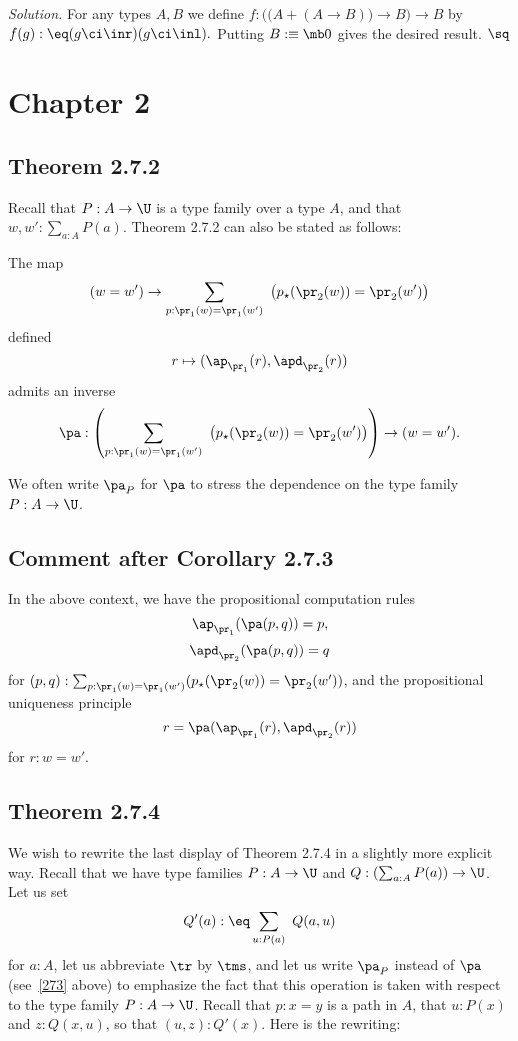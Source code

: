 \documentclass[12pt]{article}
\begin{document}
\nn\emph{Solution.} For any types $A,B$ we define $f:\Big(\big(A+(A\to B)\big)\to B\Big)\to B$ by $f(g):\eq(g\ci\inr)(g\ci\inl).$ Putting $B:\equiv\mb0$ gives the desired result. $\sq$


\section{Chapter 2}

\subsection{Theorem 2.7.2}\label{272}

Recall that $P:A\to\U$ is a type family over a type $A$, and that $w,w':\sum_{a:A}P(a)$. Theorem 2.7.2 can also be stated as follows: 

The map 
$$
(w=w')\to\sum_{p:\pr_1(w)=\pr_1(w')}\ \big(p_\star(\pr_2(w))=\pr_2(w')\big)
$$ 
defined 
$$
r\mapsto(\ap_{\pr_1}(r),\apd_{\pr_2}(r))
$$ 
admits an inverse 
\begin{equation}\label{273}
\pa:\left(\sum_{p:\pr_1(w)=\pr_1(w')}\ \big(p_\star(\pr_2(w))=\pr_2(w')\big)\right)\to(w=w').
\end{equation}

We often write $\pa_P$ for $\pa$ to stress the dependence on the type family $P:A\to\U$. 


\subsection{Comment after Corollary 2.7.3}

In the above context, we have the propositional computation rules 
$$
\ap_{\pr_1}(\pa(p,q))=p,
$$
$$
\apd_{\pr_2}(\pa(p,q))=q
$$
for $(p,q):\sum_{p:\pr_1(w)=\pr_1(w')}(p_\star(\pr_2(w))=\pr_2(w'))$, and the propositional uniqueness principle 
$$
r=\pa(\ap_{\pr_1}(r),\apd_{\pr_2}(r))
$$ 
for $r:w=w'$. 


\subsection{Theorem 2.7.4}\label{274}

We wish to rewrite the last display of Theorem 2.7.4 in a slightly more explicit way. Recall that we have type families $P:A\to\U$ and $Q:(\sum_{a:A}P(a))\to\U$. Let us set 
$$
Q'(a):\eq\sum_{u:P(a)}\ Q(a,u)
$$ 
for $a:A$, let us abbreviate $\tr$ by $\tms$, and let us write $\pa_P$ instead of $\pa$ (see~\eqref{273} above) to emphasize the fact that this operation is taken with respect to the type family $P:A\to\U$. Recall that $p:x=y$ is a path in $A$, that $u:P(x)$ and $z:Q(x,u)$, so that $(u,z):Q'(x)$. Here is the rewriting:
\end{document}
